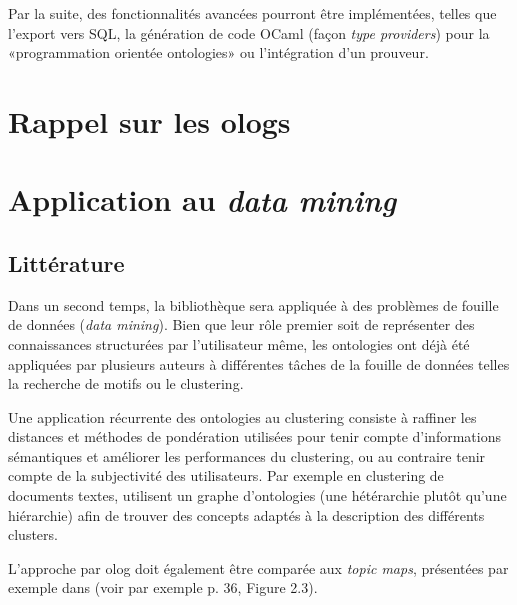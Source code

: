 \documentclass[a4paper]{scrartcl}
\begin{document}
Par la suite, des fonctionnalités avancées pourront être implémentées, telles
que l'export vers SQL, la génération de code OCaml (façon \emph{type
providers}) pour la «programmation orientée ontologies» ou l'intégration d'un
prouveur.

\section{Rappel sur les ologs}

\section{Application au \emph{data mining}}

\subsection{Littérature}

Dans un second temps, la bibliothèque sera appliquée à des problèmes de fouille
de données (\emph{data mining}). Bien que leur rôle premier soit de représenter
des connaissances structurées par l'utilisateur même, les ontologies ont déjà
été appliquées par plusieurs auteurs à différentes tâches de la fouille de
données telles la recherche de motifs ou le clustering.

Une application récurrente des ontologies au clustering consiste à raffiner les
distances et méthodes de pondération utilisées pour tenir compte d'informations
sémantiques et améliorer les performances du clustering, ou au contraire tenir
compte de la subjectivité des utilisateurs. Par exemple en clustering de
documents textes, \textcite{hotho-ontology-clustering} utilisent un graphe
d'ontologies (une hétérarchie plutôt qu'une hiérarchie) afin de trouver des
concepts adaptés à la description des différents clusters.

L'approche par olog doit également être comparée aux \emph{topic maps},
présentées par exemple dans \textcite{ellouze-topic-maps-thesis} (voir par
exemple p. 36, Figure 2.3).

\printbibliography
\end{document}
